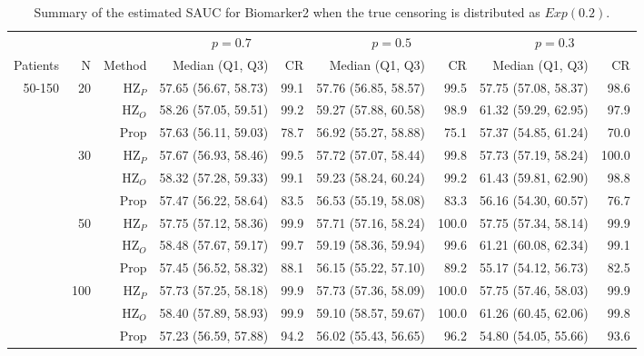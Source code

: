 \begin{table}[!htb]

\caption{\label{tab:sauc2}Summary of the estimated SAUC for Biomarker2 when the true censoring is distributed as $Exp(0.2)$.}
\centering
\begin{threeparttable}
\begin{tabular}[t]{rrrrrrrrr}
\toprule
\multicolumn{1}{c}{} & \multicolumn{1}{c}{} & \multicolumn{1}{c}{} & \multicolumn{2}{c}{$p = 0.7$} & \multicolumn{2}{c}{$p = 0.5$} & \multicolumn{2}{c}{$p = 0.3$} \\
\cmidrule(l{3pt}r{3pt}){4-5} \cmidrule(l{3pt}r{3pt}){6-7} \cmidrule(l{3pt}r{3pt}){8-9}
Patients & N & Method & Median (Q1, Q3) & CR & Median (Q1, Q3) & CR & Median (Q1, Q3) & CR\\
\midrule
50-150 & 20 & HZ$_P$ & 57.65 (56.67, 58.73) & 99.1 & 57.76 (56.85, 58.57) & 99.5 & 57.75 (57.08, 58.37) & 98.6\\
 &  & HZ$_O$ & 58.26 (57.05, 59.51) & 99.2 & 59.27 (57.88, 60.58) & 98.9 & 61.32 (59.29, 62.95) & 97.9\\
 &  & Prop & 57.63 (56.11, 59.03) & 78.7 & 56.92 (55.27, 58.88) & 75.1 & 57.37 (54.85, 61.24) & 70.0\\
\addlinespace
 & 30 & HZ$_P$ & 57.67 (56.93, 58.46) & 99.5 & 57.72 (57.07, 58.44) & 99.8 & 57.73 (57.19, 58.24) & 100.0\\
 &  & HZ$_O$ & 58.32 (57.28, 59.33) & 99.1 & 59.23 (58.24, 60.24) & 99.2 & 61.43 (59.81, 62.90) & 98.8\\
 &  & Prop & 57.47 (56.22, 58.64) & 83.5 & 56.53 (55.19, 58.08) & 83.3 & 56.16 (54.30, 60.57) & 76.7\\
\addlinespace
 & 50 & HZ$_P$ & 57.75 (57.12, 58.36) & 99.9 & 57.71 (57.16, 58.24) & 100.0 & 57.75 (57.34, 58.14) & 99.9\\
 &  & HZ$_O$ & 58.48 (57.67, 59.17) & 99.7 & 59.19 (58.36, 59.94) & 99.6 & 61.21 (60.08, 62.34) & 99.1\\
 &  & Prop & 57.45 (56.52, 58.32) & 88.1 & 56.15 (55.22, 57.10) & 89.2 & 55.17 (54.12, 56.73) & 82.5\\
\addlinespace
 & 100 & HZ$_P$ & 57.73 (57.25, 58.18) & 99.9 & 57.73 (57.36, 58.09) & 100.0 & 57.75 (57.46, 58.03) & 99.9\\
 &  & HZ$_O$ & 58.40 (57.89, 58.93) & 99.9 & 59.10 (58.57, 59.67) & 100.0 & 61.26 (60.45, 62.06) & 99.8\\
 &  & Prop & 57.23 (56.59, 57.88) & 94.2 & 56.02 (55.43, 56.65) & 96.2 & 54.80 (54.05, 55.66) & 93.6\\

\end{tabular}
\end{threeparttable}
\end{table}
